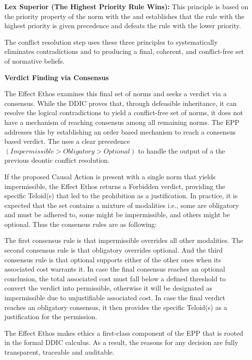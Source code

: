 \textbf{Lex Superior (The Highest Priority Rule Wins): } This principle is based on the priority property of the norm with the and establishes that the rule with the highest priority is given precedence and defeats the rule with the lower priority.  

The conflict resolution step uses these three principles to systematically eliminates contradictions and to producing a final, coherent, and conflict-free set of normative beliefs.

\textbf{Verdict Finding via Consensus}

The Effect Ethos examines this final set of norms and seeks a verdict via a  consensus. While the DDIC proves that, through defeasible inheritance, it can resolve the logical contradictions to yield a conflict-free set of norms, it does not have a mechanism of reaching consensus among all remaining norms. The EPP addresses this by establishing an order based  mechanism to reach a consensus based verdict. The uses a clear precedence $(Impermissible > Obligatory > Optional)$ to handle the output of a the previous deontic conflict resolution. 

If the proposed Causal Action is present with a single norm that yields impermissible, the Effect Ethos returns a Forbidden verdict, providing the specific Teloid(s) that led to the prohibition as a justification. In practice, it is expected that the set contains a mixture of modalities i.e., some are obligatory and must be adhered to, some might be impermissible, and others might be optional. Thus the consensus rules are as following:

The first consensus rule is that impermissible overrides all other modalities. 
The second  consensus rule is that  obligatory overrides optional. 
And the third consensus rule is that optional supports either of the other ones when its associated cost warrants it. In case the final consensus reaches an optional conclusion, the total  associated cost must fall below a defined threshold to convert the verdict into permissible, otherwise it will be designated as impermissible due to unjustifiable associated cost. In case the final verdict reaches an obligatory consensus, it then provides the specific Teloid(s) as a justification for the permission.

The Effect Ethos makes ethics a first-class component of the EPP that is rooted in the formal DDIC calculus. As a result, the reasons for any decision are fully transparent, traceable and auditable. 


